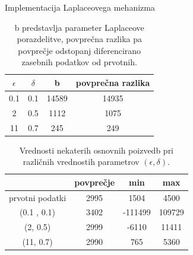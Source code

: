 \documentclass{beamer}
\begin{document}
\begin{frame}{Implementacija Laplaceovega mehanizma}
\begin{table}
\begin{center}
 \begin{tabular}{| c | c | c | c |} 
 \hline
 \textbf{$\epsilon$} & \textbf{$\delta$} & b & povprečna razlika  \\ [0.5ex] 
 \hline
 0.1 & 0.1 & 14589 & 14935  \\ 
 \hline
 2 & 0.5 & 1112 & 1075\\
 \hline
 11 & 0.7 & 245 & 249 \\
 \hline
\end{tabular}
\caption{b predstavlja parameter Laplaceove porazdelitve, povprečna razlika pa povprečje odstopanj diferencirano zasebnih podatkov od prvotnih. }
\end{center}
\end{table}
\begin{table}
\begin{center}
 \begin{tabular}{| c | c | c | c |} 
 \hline
 & povprečje & min & max  \\ [0.5ex] 
 \hline
 prvotni podatki & 2995 & 1504 & 4500  \\ 
 \hline
 (0.1 , 0.1) & 3402 & -111499 & 109729\\
 \hline
 (2, 0.5) & 2999 & -6110 & 11411 \\
 \hline
 (11, 0.7) & 2990 & 765 & 5360 \\
 \hline
\end{tabular}
\caption{Vrednosti nekaterih osnovnih poizvedb pri različnih vrednostih parametrov $(\epsilon, \delta)$. }
\end{center}
\end{table}
\end{frame}
\end{document}
